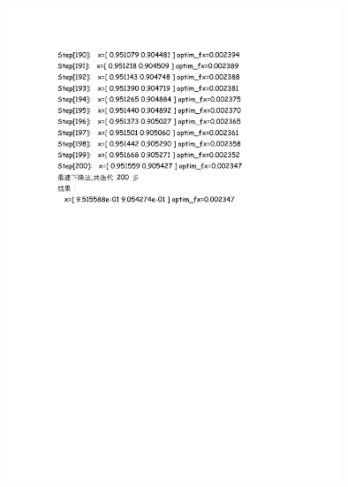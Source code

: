 \documentclass[UTF8]{ctexart}
\begin{document}
\begin{enumerate}
\begin{figure}[H]
\centering
\includegraphics[width=10cm]{fig/2_5.pdf}
\end{figure}


\end{enumerate}
\end{document}
